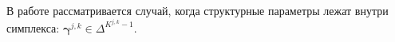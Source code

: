 \documentclass[11pt, a5paper]{dissert}
\theoremstyle{definition}
\newcommand{\T}{\mathsf{T}}
\begin{document}

В работе рассматривается случай, когда структурные параметры лежат внутри симплекса: $\boldsymbol{\gamma}^{j,k} \in {\Delta}^{K^{j,k}-1}$.%
\end{document}
